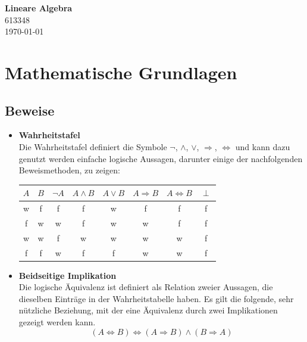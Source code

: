 \documentclass{article}
\begin{document}
\begin{center}
	\Large{\textbf{Lineare Algebra}}\\
	\small{613348}\\
	\small{\today}
\end{center}


\tableofcontents


\newpage


\section{Mathematische Grundlagen}
\subsection{Beweise}
\begin{itemize}	
	\item \textbf{Wahrheitstafel}\\
	Die Wahrheitstafel definiert die Symbole $\neg$, $\wedge$, $\vee$, $\Rightarrow$, $\Leftrightarrow$ und kann dazu genutzt werden einfache logische Aussagen, darunter einige der nachfolgenden Beweismethoden, zu zeigen:
		\begin{table}[h]
			\centering
			\begin{tabular}{c|c||c|c|c|c|c|c}
				\hline\hline
					$A$ & $B$ & $\neg A$ & $A \wedge B$ & $A \vee B$ & $A \Rightarrow B$ & $A \Leftrightarrow B$ & $\perp$ \\
				\hline
					w & f & f & f & w & f & f & f \\
					f & w & w & f & w & w & f & f \\
					w & w & f & w & w & w & w & f \\
					f & f & w & f & f & w & w & f \\
				\hline\hline
			\end{tabular}
		\end{table}


	\item \textbf{Beidseitige Implikation}\\
	Die logische Äquivalenz ist definiert als Relation zweier Aussagen, die dieselben Einträge in der Wahrheitstabelle haben. Es gilt die folgende, sehr nützliche Beziehung, mit der eine Äquivalenz durch zwei Implikationen gezeigt werden kann.
		\begin{equation}
			(A\Leftrightarrow B) \Leftrightarrow (A\Rightarrow B) \wedge (B\Rightarrow A)
		\end{equation}


\end{itemize}
\end{document}
